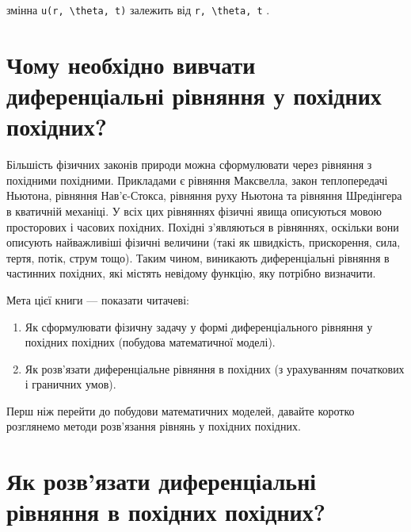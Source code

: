 \documentclass[
  ukrainian,
]{article}
\begin{document}
змінна \texttt{u(r,\ \textbackslash{}theta,\ t)} залежить від
\texttt{r,\ \textbackslash{}theta,\ t} .

\section{Чому необхідно вивчати диференціальні рівняння у похідних
похідних?}\label{ux447ux43eux43cux443-ux43dux435ux43eux431ux445ux456ux434ux43dux43e-ux432ux438ux432ux447ux430ux442ux438-ux434ux438ux444ux435ux440ux435ux43dux446ux456ux430ux43bux44cux43dux456-ux440ux456ux432ux43dux44fux43dux43dux44f-ux443-ux43fux43eux445ux456ux434ux43dux438ux445-ux43fux43eux445ux456ux434ux43dux438ux445}

Більшість фізичних законів природи можна сформулювати через рівняння з
похідними похідними. Прикладами є рівняння Максвелла, закон
теплопередачі Ньютона, рівняння Нав'є-Стокса, рівняння руху Ньютона та
рівняння Шредінгера в кватичній механіці. У всіх цих рівняннях фізичні
явища описуються мовою просторових і часових похідних. Похідні
з'являються в рівняннях, оскільки вони описують найважливіші фізичні
величини (такі як швидкість, прискорення, сила, тертя, потік, струм
тощо). Таким чином, виникають диференціальні рівняння в частинних
похідних, які містять невідому функцію, яку потрібно визначити.

Мета цієї книги --- показати читачеві:

\begin{enumerate}
\def\labelenumi{\arabic{enumi}.}
\item
  Як сформулювати фізичну задачу у формі диференціального рівняння у
  похідних похідних (побудова математичної моделі).
\item
  Як розв'язати диференціальне рівняння в похідних (з урахуванням
  початкових і граничних умов).
\end{enumerate}

Перш ніж перейти до побудови математичних моделей, давайте коротко
розглянемо методи розв'язання рівнянь у похідних похідних.

\section{Як розв'язати диференціальні рівняння в похідних
похідних?}\label{ux44fux43a-ux440ux43eux437ux432ux44fux437ux430ux442ux438-ux434ux438ux444ux435ux440ux435ux43dux446ux456ux430ux43bux44cux43dux456-ux440ux456ux432ux43dux44fux43dux43dux44f-ux432-ux43fux43eux445ux456ux434ux43dux438ux445-ux43fux43eux445ux456ux434ux43dux438ux445}
\end{document}
